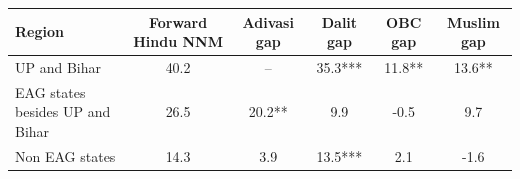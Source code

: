 \begin{tabular}{lccccc}
\hline
Region & Forward Hindu NNM & Adivasi gap & Dalit gap & OBC gap & Muslim gap \\
\hline
UP and Bihar&40.2&--&35.3***&11.8**&13.6**\\
EAG states besides UP and Bihar&26.5&20.2**&9.9&-0.5&9.7\\
Non EAG states&14.3&3.9&13.5***&2.1&-1.6\\
\hline
\end{tabular}
